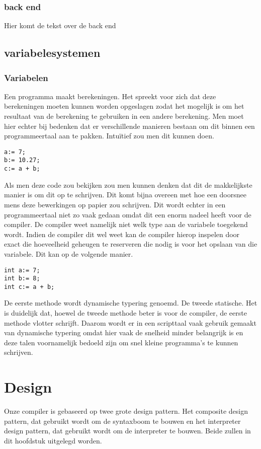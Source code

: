 \documentclass[12pt,a4paper]{article}
\begin{document}
\subsubsection{back end}
Hier komt de tekst over de back end

\subsection{variabelesystemen}
\subsubsection{Variabelen}
Een programma maakt berekeningen. Het spreekt voor zich dat deze berekeningen moeten kunnen worden opgeslagen zodat het mogelijk is om het resultaat van de berekening te gebruiken in een andere berekening. Men moet hier echter bij bedenken dat er verschillende manieren bestaan om dit binnen een programmeertaal aan te pakken. Intuïtief zou men dit kunnen doen.

\begin{verbatim}
a:= 7;
b:= 10.27;
c:= a + b;
\end{verbatim}

Als men deze code zou bekijken zou men kunnen denken dat dit de makkelijkste manier is om dit op te schrijven. Dit komt bijna overeen met hoe een doorsnee mens deze bewerkingen op papier zou schrijven. Dit wordt echter in een programmeertaal niet zo vaak gedaan omdat dit een enorm nadeel heeft voor de compiler. De compiler weet namelijk niet welk type aan de variabele toegekend wordt. Indien de compiler dit wel weet kan de compiler hierop inspelen door exact die hoeveelheid geheugen te reserveren die nodig is voor het opslaan van die variabele. Dit kan op de volgende manier.

\begin{verbatim}
int a:= 7;
int b:= 8;
int c:= a + b;
\end{verbatim}

De eerste methode wordt dynamische typering genoemd. De tweede statische. Het is duidelijk dat, hoewel de tweede methode beter is voor de compiler, de eerste methode vlotter schrijft. Daarom wordt er in een scripttaal vaak gebruik gemaakt van dynamische typering omdat hier vaak de snelheid minder belangrijk is en deze talen voornamelijk bedoeld zijn om snel kleine programma's te kunnen schrijven.  

\section{Design}
Onze compiler is gebaseerd op twee grote design pattern. Het composite design pattern, dat gebruikt wordt om de syntaxboom te bouwen en het interpreter design pattern, dat gebruikt wordt om de interpreter te bouwen. Beide zullen in dit hoofdstuk uitgelegd worden.
\end{document}
